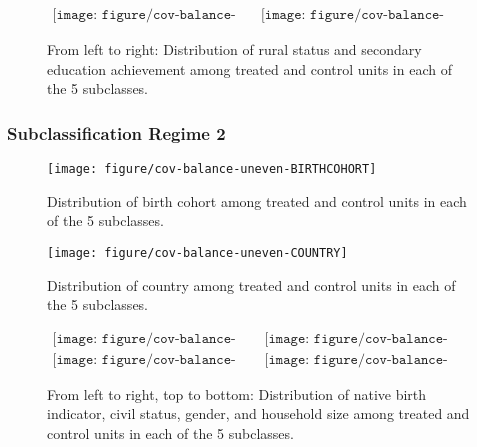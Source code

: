 \documentclass[letterpaper,11pt]{article}
\begin{document}
\begin{figure}[htb]
\begin{centering}
$\begin{array}{cc}
\texttt{[image: figure/cov-balance-even-RURALFIN.pdf]} & \texttt{[image: figure/cov-balance-even-SECONDARY.pdf]}\end{array}$ 
\par\end{centering}

\protect\caption{From left to right: Distribution of rural status and secondary education achievement
among treated and control units in each of the 5 subclasses.}


\label{fig:cov-even2} 
\end{figure}


\clearpage{}


\subsubsection{Subclassification Regime 2}

\begin{figure}[htb]
\centering \texttt{[image: figure/cov-balance-uneven-BIRTHCOHORT]}
\protect\caption{Distribution of birth cohort among treated and control units in each of the 5 subclasses.}


\label{fig:cov-balance-uneven-birthcohort} 
\end{figure}


\begin{figure}[htb]
\centering \texttt{[image: figure/cov-balance-uneven-COUNTRY]}
\protect\caption{Distribution of country among treated and control units in each of the 5 subclasses.}


\label{fig:cov-balance-uneven-country} 
\end{figure}


\begin{figure}[htb]
\begin{centering}
$\begin{array}{cc}
\texttt{[image: figure/cov-balance-uneven-BORN.pdf]} & \texttt{[image: figure/cov-balance-uneven-CIVIL.pdf]}\\
\texttt{[image: figure/cov-balance-uneven-GENDER.pdf]} & \texttt{[image: figure/cov-balance-uneven-HHSIZE.pdf]}
\end{array}$ 
\par\end{centering}

\protect\caption{From left to right, top to bottom: Distribution of native birth indicator, civil
status, gender, and household size among treated and control units in each of the
5 subclasses.}


\label{fig:cov-uneven1} 
\end{figure}
\end{document}
